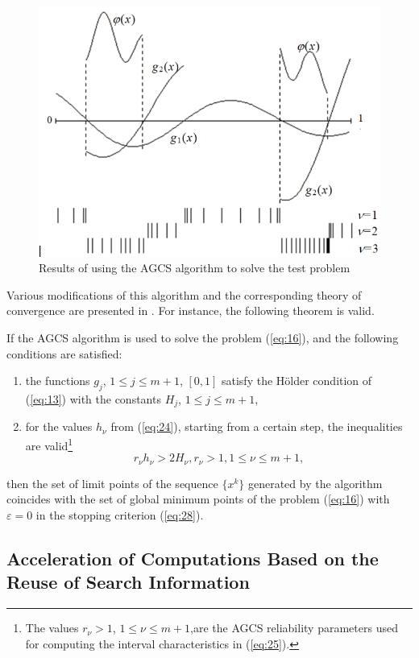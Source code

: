 \documentclass[smallextended]{svjour3}       %
\begin{document}
\begin{figure}
  \centering
  \includegraphics[width=0.6\linewidth]{fig2}
  \caption{Results of using the AGCS algorithm to solve the test problem}
  \label{fig:2}
\end{figure}

Various modifications of this algorithm and the corresponding theory of convergence are presented in \cite{c18}. For instance, the following theorem is valid.

\begin{theorem}
If the AGCS algorithm is used to solve the problem (\ref{eq:16}), and the following conditions are satisfied:
\begin{enumerate}
	\item the functions $g_j$, $1 \leq j \leq m+1$, $[0,1]$ satisfy the H\"older condition of (\ref{eq:13}) with the constants $H_j$, $1 \leq j \leq m+1$,
	\item for the values $h_\nu$ from (\ref{eq:24}), starting from a certain step, the inequalities are valid\footnote{The values $r_{\nu} > 1$, $1 \leq \nu \leq m+1$,are the AGCS reliability parameters used for computing the interval characteristics in (\ref{eq:25}).}
\begin{equation} \label{eq:29}
r_\nu h_\nu > 2H_\nu, r_\nu > 1, 1 \leq \nu \leq m+1,
\end{equation}
\end{enumerate}
then the set of limit points of the sequence $\{x^k\}$ generated by the algorithm coincides with the set of global minimum points of the problem (\ref{eq:16}) with $\varepsilon=0$ in the stopping criterion (\ref{eq:28}).
\end{theorem}

\subsection{Acceleration of Computations Based on the Reuse of Search Information}
\end{document}
